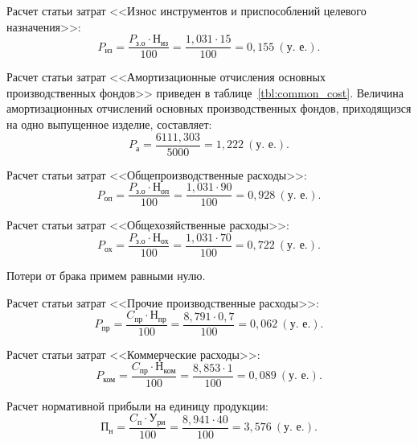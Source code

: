 Расчет статьи затрат 
<<Износ инструментов и приспособлений целевого назначения>>:
\begin{equation*}
P_{\text{из}} = 
\dfrac{
  P_{\text{з.о}} \cdot \text{Н}_{\text{из}}
}{
  100
} =
\dfrac{1{,}031 \cdot 15}{100} =
0{,}155 \: (\text{у.~е.}).
\end{equation*}

Расчет статьи затрат 
<<Амортизационные отчисления основных производственных фондов>> 
приведен в таблице~\ref{tbl:common_cost}.
Величина амортизационных отчислений основных производственных фондов,
приходящизся на одно выпущенное изделие, составляет: 
\begin{equation*}
P_{\text{а}} = 
\dfrac{6111{,}303}{5000} =
1{,}222 \: (\text{у.~е.}).
\end{equation*}

Расчет статьи затрат 
<<Общепроизводственные расходы>>:
\begin{equation*}
P_{\text{оп}} = 
\dfrac{
  P_{\text{з.о}} \cdot \text{Н}_{\text{оп}}
}{
  100
} =
\dfrac{1{,}031 \cdot 90}{100} =
0{,}928 \: (\text{у.~е.}).
\end{equation*}

Расчет статьи затрат 
<<Общехозяйственные расходы>>:
\begin{equation*}
P_{\text{ох}} = 
\dfrac{
  P_{\text{з.о}} \cdot \text{Н}_{\text{ох}}
}{
  100
} =
\dfrac{1{,}031 \cdot 70}{100} =
0{,}722 \: (\text{у.~е.}).
\end{equation*}

Потери от брака примем равными нулю.

Расчет статьи затрат 
<<Прочие производственные расходы>>:
\begin{equation*}
P_{\text{пр}} = 
\dfrac{
  C_{\text{пр}} \cdot \text{Н}_{\text{пр}}
}{
  100
} =
\dfrac{8{,}791 \cdot 0{,}7}{100} =
0{,}062 \: (\text{у.~е.}).
\end{equation*}

Расчет статьи затрат
<<Коммерческие расходы>>:
\begin{equation*}
P_{\text{ком}} = 
\dfrac{
  C_{\text{пр}} \cdot \text{Н}_{\text{ком}}
}{
  100
} =
\dfrac{8{,}853 \cdot 1}{100} =
0{,}089 \: (\text{у.~е.}).
\end{equation*}

Расчет нормативной прибыли на единицу продукции:
\begin{equation*}
\text{П}_{\text{н}} = 
\dfrac{
  C_{\text{п}} \cdot \text{У}_{\text{ри}}
}{
  100
} =
\dfrac{8{,}941 \cdot 40}{100} =
3{,}576 \: (\text{у.~е.}).
\end{equation*}

